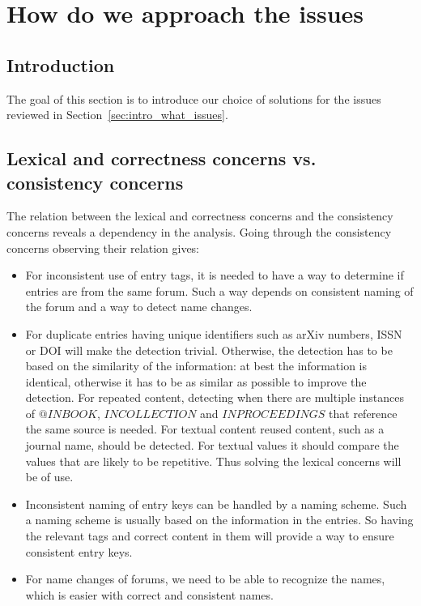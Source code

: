 \section{How do we approach the {\bibtex} issues}
\subsection{Introduction}

The goal of this section is to introduce our choice of solutions for
the issues reviewed in Section~\ref{sec:intro_what_issues}.


\subsection{Lexical and correctness concerns vs. consistency concerns}
\label{sec:approach_lexical_consistency}

The relation between the lexical and correctness concerns and the
consistency concerns reveals a dependency in the analysis.  Going
through the consistency concerns observing their relation gives:

\begin{itemize}
\item For inconsistent use of entry tags, it is needed to have a way
  to determine if entries are from the same forum.  Such a
  way depends on consistent naming of the forum and a way to detect
  name changes.

\item For duplicate entries having unique identifiers such as arXiv
  numbers, ISSN or DOI will make the detection trivial.  Otherwise,
  the detection has to be based on the similarity of the information:
  at best the information is identical, otherwise it has to be as
  similar as possible to improve the detection.  For repeated content,
  detecting when there are multiple instances of $@INBOOK$,
  $INCOLLECTION$ and $INPROCEEDINGS$ that reference the same source is
  needed.  For textual content reused content, such as a journal name,
  should be detected.  For textual values it should compare the
  values that are likely to be repetitive.  Thus solving the lexical
  concerns will be of use.

\item Inconsistent naming of entry keys can be handled by a naming
  scheme.  Such a naming scheme is usually based on the information in
  the entries.  So having the relevant tags and correct content in
  them will provide a way to ensure consistent entry keys.

\item For name changes of forums, we need to be able to recognize the
  names, which is easier with correct and consistent names.
\end{itemize}

